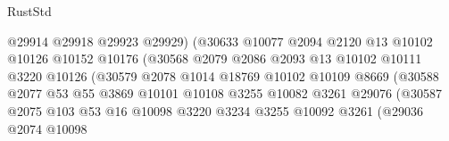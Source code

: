 \begin{lexlean}{RustStd}
\begin{coremodule}
                                      @29914
                                      @29918
                                      @29923
                                      @29929)
                                    (@30633
                                      @10077
                                      @2094
                                      @2120
                                      @13
                                      @10102
                                      @10126
                                      @10152
                                      @10176
                                      (@30568
                                        @2079
                                        @2086
                                        @2093
                                        @13
                                        @10102
                                        @10111
                                        @3220
                                        @10126
                                        (@30579
                                          @2078
                                          @1014
                                          @18769
                                          @10102
                                          @10109
                                          @8669
                                          (@30588
                                            @2077
                                            @53
                                            @55
                                            @3869
                                            @10101
                                            @10108
                                            @3255
                                            @10082
                                            @3261
                                            @29076
                                            (@30587
                                              @2075
                                              @103
                                              @53
                                              @16
                                              @10098
                                              @3220
                                              @3234
                                              @3255
                                              @10092
                                              @3261
                                              (@29036
                                                @2074
                                                @10098

\end{coremodule}
\end{lexlean}
